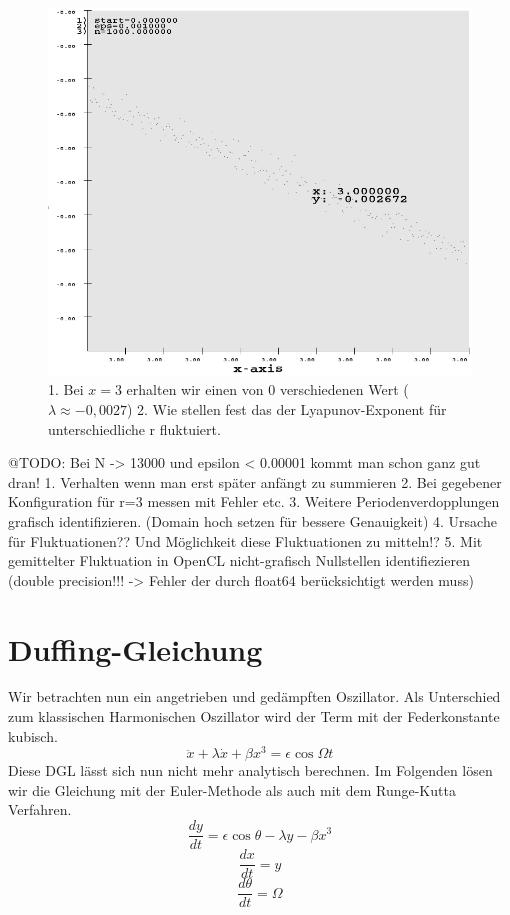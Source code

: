 \documentclass{scrartcl}
\begin{document}
\begin{figure}
	\centering
	\includegraphics[scale=0.50]{lyapunov_1000_at_3}
	\caption{1. Bei $x=3$ erhalten wir einen von 0 verschiedenen Wert ($\lambda\approx-0,0027$) 2. Wie stellen fest das der Lyapunov-Exponent für unterschiedliche r fluktuiert.}
	\label{img:lyapunov_1000_at_3}
\end{figure}
\newline
@TODO: Bei N -> 13000 und epsilon < 0.00001 kommt man schon ganz gut dran!
1. Verhalten wenn man erst später anfängt zu summieren
2. Bei gegebener Konfiguration für r=3 messen mit Fehler etc.
3. Weitere Periodenverdopplungen grafisch identifizieren. (Domain hoch setzen für bessere Genauigkeit)
4. Ursache für Fluktuationen?? Und Möglichkeit diese Fluktuationen zu mitteln!?
5. Mit gemittelter Fluktuation in OpenCL nicht-grafisch Nullstellen identifiezieren (double precision!!! -> Fehler der durch float64 berücksichtigt werden muss)

\section { Duffing-Gleichung}
Wir betrachten nun ein angetrieben und gedämpften Oszillator. Als Unterschied zum klassischen Harmonischen Oszillator wird der Term mit der Federkonstante kubisch.
$$\ddot{x}+\lambda\dot{x}+\beta x^3=\epsilon\cos{\Omega t}$$
Diese DGL lässt sich nun nicht mehr analytisch berechnen.
Im Folgenden lösen wir die Gleichung mit der Euler-Methode als auch mit dem Runge-Kutta Verfahren.
$$\frac{dy}{dt}=\epsilon\cos{\theta}-\lambda y - \beta x^3$$
$$\frac{dx}{dt}=y$$
$$\frac{d\theta}{dt}=\Omega$$
\end{document}

